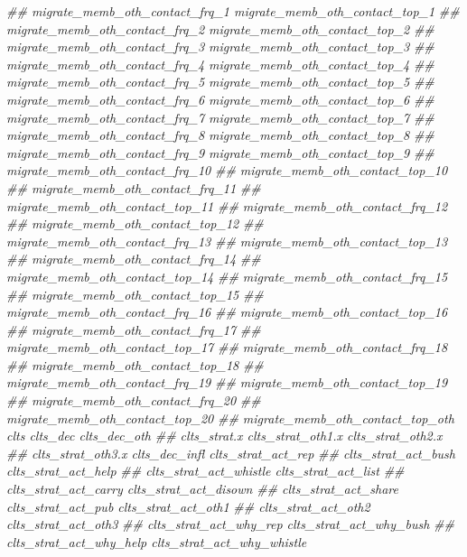 \documentclass[
]{article}
\newenvironment{Shaded}{\begin{snugshade}}{\end{snugshade}}
\newcommand{\CommentTok}[1]{\textcolor[rgb]{0.56,0.35,0.01}{\textit{#1}}}
\begin{document}
\begin{Shaded}
\begin{Highlighting}[]
\CommentTok{##      migrate_memb_oth_contact_frq_1 migrate_memb_oth_contact_top_1}
\CommentTok{##      migrate_memb_oth_contact_frq_2 migrate_memb_oth_contact_top_2}
\CommentTok{##      migrate_memb_oth_contact_frq_3 migrate_memb_oth_contact_top_3}
\CommentTok{##      migrate_memb_oth_contact_frq_4 migrate_memb_oth_contact_top_4}
\CommentTok{##      migrate_memb_oth_contact_frq_5 migrate_memb_oth_contact_top_5}
\CommentTok{##      migrate_memb_oth_contact_frq_6 migrate_memb_oth_contact_top_6}
\CommentTok{##      migrate_memb_oth_contact_frq_7 migrate_memb_oth_contact_top_7}
\CommentTok{##      migrate_memb_oth_contact_frq_8 migrate_memb_oth_contact_top_8}
\CommentTok{##      migrate_memb_oth_contact_frq_9 migrate_memb_oth_contact_top_9}
\CommentTok{##      migrate_memb_oth_contact_frq_10}
\CommentTok{##      migrate_memb_oth_contact_top_10}
\CommentTok{##      migrate_memb_oth_contact_frq_11}
\CommentTok{##      migrate_memb_oth_contact_top_11}
\CommentTok{##      migrate_memb_oth_contact_frq_12}
\CommentTok{##      migrate_memb_oth_contact_top_12}
\CommentTok{##      migrate_memb_oth_contact_frq_13}
\CommentTok{##      migrate_memb_oth_contact_top_13}
\CommentTok{##      migrate_memb_oth_contact_frq_14}
\CommentTok{##      migrate_memb_oth_contact_top_14}
\CommentTok{##      migrate_memb_oth_contact_frq_15}
\CommentTok{##      migrate_memb_oth_contact_top_15}
\CommentTok{##      migrate_memb_oth_contact_frq_16}
\CommentTok{##      migrate_memb_oth_contact_top_16}
\CommentTok{##      migrate_memb_oth_contact_frq_17}
\CommentTok{##      migrate_memb_oth_contact_top_17}
\CommentTok{##      migrate_memb_oth_contact_frq_18}
\CommentTok{##      migrate_memb_oth_contact_top_18}
\CommentTok{##      migrate_memb_oth_contact_frq_19}
\CommentTok{##      migrate_memb_oth_contact_top_19}
\CommentTok{##      migrate_memb_oth_contact_frq_20}
\CommentTok{##      migrate_memb_oth_contact_top_20}
\CommentTok{##      migrate_memb_oth_contact_top_oth clts clts_dec clts_dec_oth}
\CommentTok{##      clts_strat.x clts_strat_oth1.x clts_strat_oth2.x}
\CommentTok{##      clts_strat_oth3.x clts_dec_infl clts_strat_act_rep}
\CommentTok{##      clts_strat_act_bush clts_strat_act_help}
\CommentTok{##      clts_strat_act_whistle clts_strat_act_list}
\CommentTok{##      clts_strat_act_carry clts_strat_act_disown}
\CommentTok{##      clts_strat_act_share clts_strat_act_pub clts_strat_act_oth1}
\CommentTok{##      clts_strat_act_oth2 clts_strat_act_oth3}
\CommentTok{##      clts_strat_act_why_rep clts_strat_act_why_bush}
\CommentTok{##      clts_strat_act_why_help clts_strat_act_why_whistle}

\end{Highlighting}
\end{Shaded}
\end{document}
